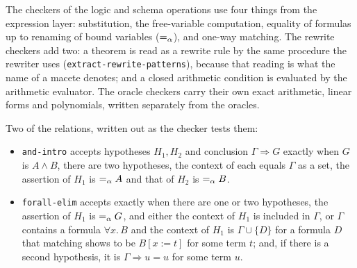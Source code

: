 The checkers of the logic and schema operations use four things from the
expression layer: substitution, the free-variable computation, equality
of formulas up to renaming of bound variables ($=_{\alpha}$), and one-way
matching.  The rewrite checkers add two: a theorem is read as a rewrite
rule by the same procedure the rewriter uses
(\texttt{extract-rewrite-patterns}), because that reading is what the
name of a macete denotes; and a closed arithmetic condition is evaluated
by the arithmetic evaluator.  The oracle checkers carry their own exact
arithmetic, linear forms and polynomials, written separately from the
oracles.

Two of the relations, written out as the checker tests them:
\begin{itemize}
\item \texttt{and-intro} accepts hypotheses $H_1, H_2$ and conclusion
  $\Gamma \Longrightarrow G$ exactly when $G$ is $A \wedge B$, there are
  two hypotheses, the context of each equals $\Gamma$ as a set, the
  assertion of $H_1$ is $=_{\alpha} A$ and that of $H_2$ is $=_{\alpha} B$.
\item \texttt{forall-elim} accepts exactly when there are one or two
  hypotheses, the assertion of $H_1$ is $=_{\alpha} G$, and either the context
  of $H_1$ is included in $\Gamma$, or $\Gamma$ contains a formula
  $\forall x.\, B$ and the context of $H_1$ is $\Gamma \cup \{D\}$ for a
  formula $D$ that matching shows to be $B[x{:=}t]$ for some term $t$;
  and, if there is a second hypothesis, it is
  $\Gamma \Longrightarrow u = u$ for some term $u$.
\end{itemize}

